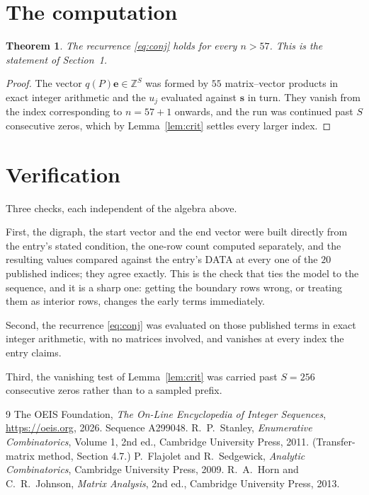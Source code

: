 \documentclass[11pt,a4paper]{article}
\theoremstyle{plain}
\newtheorem{theorem}{Theorem}
\theoremstyle{definition}
\begin{document}
\section{The computation}

\begin{theorem}
The recurrence \eqref{eq:conj} holds for every $n>57$. This is the statement of
Section~1.
\end{theorem}

\begin{proof}
The vector $q(P)\mathbf{e}\in\mathbb{Z}^{S}$ was formed by $55$ matrix--vector
products in exact integer arithmetic and the $u_j$ evaluated against $\mathbf{s}$ in turn.
They vanish from the index corresponding to $n=57+1$ onwards, and the run was continued
past $S$ consecutive zeros, which by Lemma~\ref{lem:crit} settles every larger index.
\end{proof}

\section{Verification}

Three checks, each independent of the algebra above.

First, the digraph, the start vector and the end vector were built directly from the
entry's stated condition, the one-row count computed separately, and the resulting values
compared against the entry's DATA at every one of the $20$ published indices; they
agree exactly. This is the check that ties the model to the sequence, and it is a sharp one:
getting the boundary rows wrong, or treating them as interior rows, changes the early terms
immediately.

Second, the recurrence \eqref{eq:conj} was evaluated on those published terms in exact
integer arithmetic, with no matrices involved, and vanishes at every index the entry claims.

Third, the vanishing test of Lemma~\ref{lem:crit} was carried past $S=256$ consecutive
zeros rather than to a sampled prefix.

\begin{thebibliography}{9}
 The OEIS Foundation, \emph{The On-Line Encyclopedia of Integer
Sequences}, \url{https://oeis.org}, 2026. Sequence A299048.
 R.~P.~Stanley, \emph{Enumerative Combinatorics}, Volume 1, 2nd ed.,
Cambridge University Press, 2011. (Transfer-matrix method, Section 4.7.)
 P.~Flajolet and R.~Sedgewick, \emph{Analytic Combinatorics}, Cambridge
University Press, 2009.
 R.~A.~Horn and C.~R.~Johnson, \emph{Matrix Analysis}, 2nd ed., Cambridge
University Press, 2013.
\end{thebibliography}
\end{document}
